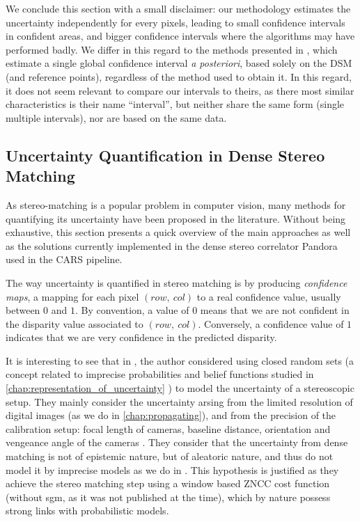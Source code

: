 We conclude this section with a small disclaimer: our methodology estimates the uncertainty independently for every pixels, leading to small confidence intervals in confident areas, and bigger confidence intervals where the algorithms may have performed badly. We differ in this regard to the methods presented in , which estimate a single global confidence interval \textit{a posteriori}, based solely on the DSM (and reference points), regardless of the method used to obtain it. In this regard, it does not seem relevant to compare our intervals to theirs, as there most similar characteristics is their name ``interval'', but neither share the same form (single \vs multiple intervals), nor are based on the same data.

\subsection{Uncertainty Quantification in Dense Stereo Matching}\label{sec:uncertainty_pandora}
As stereo-matching is a popular problem in computer vision, many methods for quantifying its uncertainty have been proposed in the literature. Without being exhaustive, this section presents a quick overview of the main approaches as well as the solutions currently implemented in the dense stereo correlator Pandora used in the CARS pipeline.

The way uncertainty is quantified in stereo matching is by producing \textit{confidence maps}, \ie a mapping for each pixel $(row, ~col)$ to a real confidence value, usually between $0$ and $1$. By convention, a value of $0$ means that we are not confident in the disparity value associated to $(row, ~col)$. Conversely, a confidence value of $1$ indicates that we are very confidence in the predicted disparity.

\begin{remark}
    It is interesting to see that in \cite{quinio_random_1992}, the author considered using closed random sets (a concept related to imprecise probabilities and belief functions studied in \cref{chap:representation_of_uncertainty} \cite{quinio_random_1991}) to model the uncertainty of a stereoscopic setup. They mainly consider the uncertainty arsing from the limited resolution of digital images (as we do in \cref{chap:propagating}), and from the precision of the calibration setup: focal length of cameras, baseline distance, orientation and vengeance angle of the cameras \etc. They consider that the uncertainty from dense matching is not of epistemic nature, but of aleatoric nature, and thus do not model it by imprecise models as we do in . This hypothesis is justified as they achieve the stereo matching step using a window based ZNCC cost function (without \acrshort{sgm}, as it was not published at the time), which by nature possess strong links with probabilistic models.
\end{remark}

